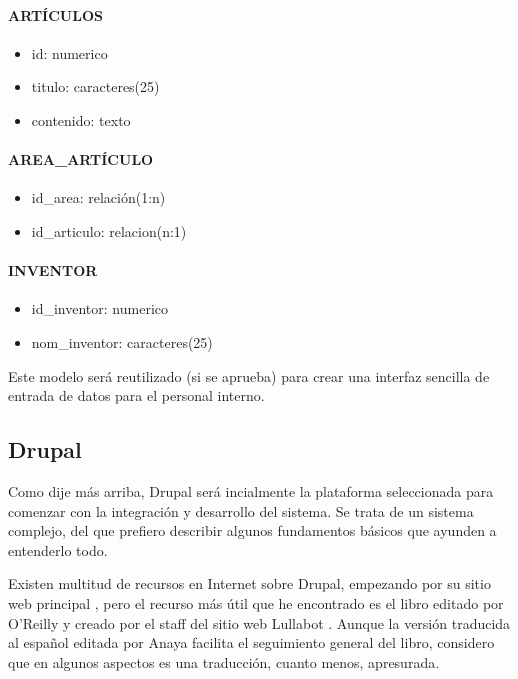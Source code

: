 \paragraph{ARTÍCULOS}
\begin{itemize}
\item id: numerico
\item titulo: caracteres(25)
\item contenido: texto
\end{itemize}

\paragraph{AREA\_ARTÍCULO}
\begin{itemize}
\item id\_area: relación(1:n)
\item id\_articulo: relacion(n:1)
\end{itemize}

\paragraph{INVENTOR}
\begin{itemize}
\item id\_inventor: numerico
\item nom\_inventor: caracteres(25)
\end{itemize}

\par Este modelo será reutilizado (si se aprueba) para crear una interfaz sencilla de entrada de datos para el personal interno.

\subsection{Drupal}

\par Como dije más arriba, Drupal será incialmente la plataforma seleccionada para comenzar con la integración y desarrollo del sistema. Se trata de un sistema complejo, del que prefiero describir algunos fundamentos básicos que ayunden a entenderlo todo.

\par Existen multitud de recursos en Internet sobre Drupal, empezando por su sitio web principal \cite{references:drupalhome}, pero el recurso más útil que he encontrado es el libro editado por O'Reilly \cite{ByronBerryHaugEatonWalkerRobbins200812} y creado por el staff del sitio web Lullabot \cite{references:lullabot}. Aunque la versión traducida al español editada por Anaya \cite{ByronBerryHaugEatonWalkerRobbins200909} facilita el seguimiento general del libro, considero que en algunos aspectos es una traducción, cuanto menos, apresurada.

